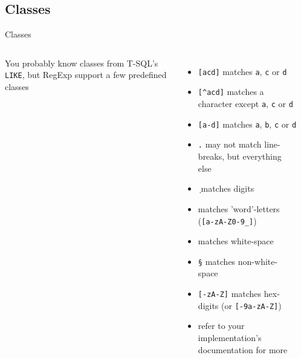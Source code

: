 \documentclass[english,aspectratio=169]{beamer}
\begin{document}
\subsection{Classes}
\begin{frame}{Classes}
\begin{columns}
        You probably know classes from T-SQL's \texttt{LIKE}, but RegExp support a few predefined classes
        \begin{itemize}
            \item \texttt{[acd]} matches \texttt{a}, \texttt{c} or \texttt{d}
            \item \texttt{[\string^acd]} matches a character except \texttt{a}, \texttt{c} or \texttt{d}
            \item \texttt{[a-d]} matches \texttt{a}, \texttt{b}, \texttt{c} or \texttt{d}
            \item \texttt{.} may\textdagger{} not match line-breaks, but everything else
            \item \texttt{\string\d} matches digits\textdagger{}
            \item \texttt{\string\w} matches 'word'-letters\textdagger{} (\texttt{[a-zA-Z0-9\_]})
            \item \texttt{\string\s} matches white-space
            \item \texttt{\string\S} matches non-white-space
            \item<2-> \texttt{[\string\da-zA-Z]} matches hex-digits\textdagger{} (or \texttt{[-9a-zA-Z]})
            \item<2-> refer to your implementation's documentation for more
        \end{itemize}
        \begin{center}
        \end{center}
\end{columns}
\end{frame}
\end{document}
